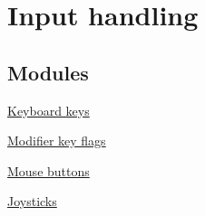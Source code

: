 \hypertarget{group__input}{\section{\-Input handling}
\label{group__input}
}
\subsection*{\-Modules}
\begin{DoxyCompactItemize}
\item 
\hyperlink{group__keys}{\-Keyboard keys}
\item 
\hyperlink{group__mods}{\-Modifier key flags}
\item 
\hyperlink{group__buttons}{\-Mouse buttons}
\item 
\hyperlink{group__joysticks}{\-Joysticks}
\end{DoxyCompactItemize}
